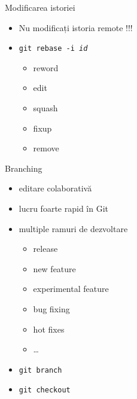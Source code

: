 \documentclass{beamer}
\begin{document}
\begin{frame}{Modificarea istoriei}
  \begin{itemize}
    \item Nu modificați istoria remote !!!
    \item \texttt{git rebase -i \textit{id}}
      \begin{itemize}
	\item reword
	\item edit
	\item squash
	\item fixup
	\item remove
      \end{itemize}
  \end{itemize}
\end{frame}

%

\begin{frame}{Branching}
  \begin{itemize}
    \item editare colaborativă
    \item lucru foarte rapid în Git
    \item multiple ramuri de dezvoltare
      \begin{itemize}
        \item release
        \item new feature
        \item experimental feature
        \item bug fixing
        \item hot fixes
        \item \ldots
      \end{itemize}
  \end{itemize}
  \begin{itemize}
    \item \texttt{git branch}
    \item \texttt{git checkout}
  \end{itemize}
\end{frame}
\end{document}
